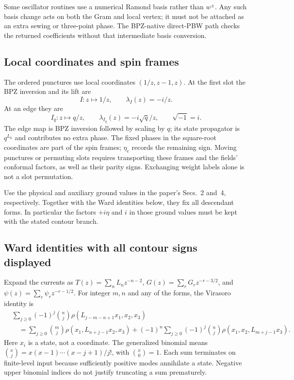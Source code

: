 Some oscillator routines use a numerical Ramond basis rather than
$w^\pm$. Any such basis change acts on both the Gram and local vertex;
it must not be attached as an extra sewing or three-point phase.
The BPZ-native direct-PBW path checks the returned coefficients
without that intermediate basis conversion.

\subsection{Local coordinates and spin frames}
\label{app:local-data}

The ordered punctures use local coordinates $(1/z,z-1,z)$.
At the first slot the BPZ inversion and its lift are
\begin{equation}
 I:z\mapsto1/z,\qquad \lambda_I(z)=-i/z.
 \label{eq:app-bpz-map}
\end{equation}
At an edge they are
\begin{equation}
 I_q:z\mapsto q/z,\qquad
 \lambda_{I_q}(z)=-i\sqrt q/z,
 \qquad \sqrt{-1}=i.
 \label{eq:app-edge-lift}
\end{equation}
The edge map is BPZ inversion followed by scaling by $q$; its
state propagator is $q^{L_0}$ and contributes no extra phase.
The fixed phases in the square-root coordinates are part of the
spin frames; $\eta_e$ records the remaining sign.
Moving punctures or permuting slots requires transporting these frames
and the fields' conformal factors, as well as their parity signs.
Exchanging weight labels alone is not a slot permutation.

Use the physical and auxiliary ground values in the paper's Secs.~2
and~4, respectively. Together with the Ward identities below, they fix
all descendant forms. In particular the factors $+i\eta$ and $i$ in
those ground values must be kept with the stated contour branch.

\subsection{Ward identities with all contour signs displayed}
\label{app:wards}

Expand the currents as $T(z)=\sum_nL_nz^{-n-2}$,
$G(z)=\sum_rG_rz^{-r-3/2}$, and
$\psi(z)=\sum_r\psi_rz^{-r-1/2}$.
For integer $m,n$ and any of the forms, the Virasoro identity is
\begin{align}
 &\sum_{j\ge0}(-1)^j\binom nj
       \rho(L_{j-m-n+1}x_1,x_2,x_3)\nonumber\\
 &\quad=\sum_{j\ge0}\binom mj\rho(x_1,L_{n+j-1}x_2,x_3)
   +(-1)^n\sum_{j\ge0}(-1)^j\binom nj
                         \rho(x_1,x_2,L_{m+j-1}x_3).
 \label{eq:app-vir-ward}
\end{align}
Here $x_i$ is a state, not a coordinate. The generalized binomial means
$\binom{x}{j}=x(x-1)\cdots(x-j+1)/j!$, with $\binom{x}{0}=1$.
Each sum terminates on finite-level input because sufficiently positive
modes annihilate a state. Negative upper binomial indices do not justify
truncating a sum prematurely.

